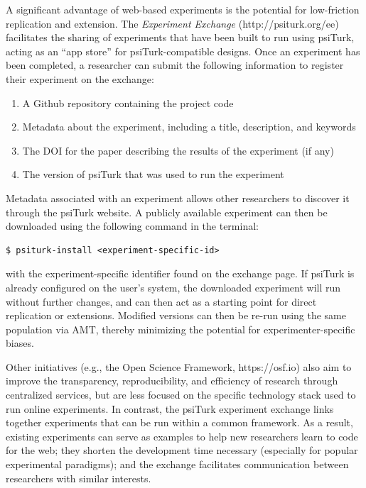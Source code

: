\documentclass[twocolumn]{svjour3}          %
\newcommand{\psiturk}[0]{\textsf{psiTurk}}
\begin{document}
A significant advantage of web-based experiments is the potential for low-friction replication and extension. 
The \emph{Experiment Exchange} (http://psiturk.org/ee) facilitates the sharing of experiments that have been built to run using \psiturk{}, acting as an ``app store'' for \psiturk{}-compatible designs.
Once an experiment has been completed, a researcher can submit the following information to register their experiment on the exchange:

\begin{enumerate}
\item A Github repository containing the project code
\item Metadata about the experiment, including a title, description, and keywords
\item The DOI for the paper describing the results of the experiment (if any)
\item The version of \psiturk{} that was used to run the experiment
\end{enumerate}


Metadata associated with an experiment allows other researchers to discover it through the \psiturk{} website.
A publicly available experiment can then be downloaded using the following command in the terminal:

\begin{lstlisting}
$ psiturk-install <experiment-specific-id>
\end{lstlisting}

\noindent with the experiment-specific identifier found on the exchange page.
If \psiturk{} is already configured on the user's system, the downloaded experiment will run without further changes, and can then act as a starting point for direct replication or extensions.
Modified versions can then be re-run using the same population via AMT, thereby minimizing the potential for experimenter-specific biases.

Other initiatives (e.g., the Open Science Framework, https://osf.io) also aim to improve the transparency, reproducibility, and efficiency of research through centralized services, but are less focused on the specific technology stack used to run online experiments.
In contrast, the \psiturk{} experiment exchange links together experiments that can be run within a common framework.
As a result, existing experiments can serve as examples to help new researchers learn to code for the web; they shorten the development time necessary (especially for popular experimental paradigms); and the exchange facilitates communication between researchers with similar interests.
\end{document}
